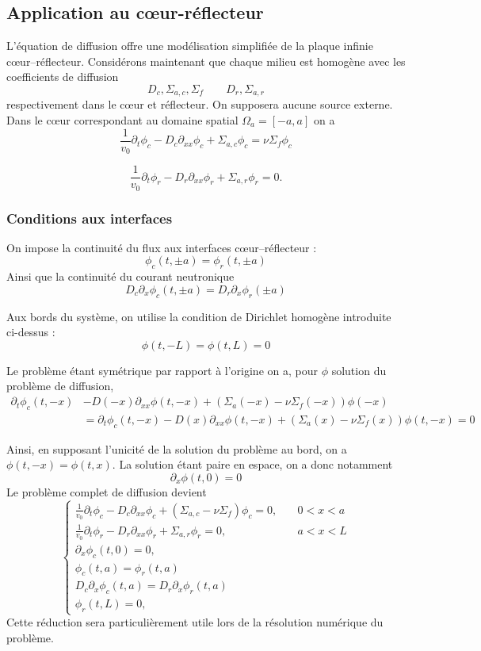 \documentclass{article}
\begin{document}
\subsection{Application au cœur-réflecteur}
L'équation de diffusion offre une modélisation simplifiée de la plaque infinie cœur--réflecteur. Considérons maintenant que chaque milieu est homogène avec les coefficients de diffusion
\[
D_c, \Sigma_{a,c}, \Sigma_f \qquad D_r, \Sigma_{a,r}
\]
respectivement dans le cœur et réflecteur. On supposera aucune source externe. Dans le cœur correspondant au domaine spatial \(\Omega_a = [-a,a]\) on a  
\begin{equation}
    \frac1{v_0}\partial_t\phi_c -D_c\partial_{xx}\phi_c + \Sigma_{a,c}\phi_c = \nu\Sigma_f\phi_c
\end{equation}

\begin{equation}
    \frac1{v_0}\partial_t\phi_r-D_r\partial_{xx}\phi_r+\Sigma_{a,r}\phi_r=0.
\end{equation}

\subsubsection{Conditions aux interfaces}
On impose la continuité du flux aux interfaces cœur--réflecteur :
\[
\phi_c(t,\pm a) = \phi_r(t,\pm a)
\]
Ainsi que la continuité du courant neutronique
\[
D_c\partial_x\phi_c(t,\pm a) = D_r\partial_x\phi_r(\pm a)
\]

Aux bords du système, on utilise la condition de Dirichlet homogène introduite ci-dessus :
\[
\phi(t,-L) = \phi(t,L) = 0
\]

Le problème étant symétrique par rapport à l'origine on a, pour $\phi$ solution du problème de diffusion,
\begin{align*}
    \partial_t\phi_c(t,-x)& -D(-x)\partial_{xx}\phi(t,-x) + (\Sigma_a(-x)-\nu\Sigma_f(-x))\phi(-x)\\
    &= \partial_t\phi_c(t,-x) -D(x)\partial_{xx}\phi(t,-x) + (\Sigma_a(x)-\nu\Sigma_f(x))\phi(t,-x) = 0
\end{align*}

Ainsi, en supposant l'unicité de la solution du problème au bord, on a \(\phi(t,-x)=\phi(t,x)\). La solution étant paire en espace, on a donc notamment
\[
\partial_x\phi(t,0) = 0
\]
Le problème complet de diffusion devient 
\[
\begin{cases}
    \frac{1}{v_0}\partial_t\phi_c - D_c\partial_{xx}\phi_c + (\Sigma_{a,c}-\nu\Sigma_{f})\phi_c = 0, \quad &0 < x <a \\
    \frac{1}{v_0}\partial_t\phi_r - D_r\partial_{xx}\phi_r + \Sigma_{a,r}\phi_r = 0, \quad &a < x <L \\
    \partial_x\phi_c(t,0) =0, \\ 
    \phi_c(t,a) = \phi_r(t,a)\\
    D_c\partial_x\phi_c(t,a) =D_r\partial_x\phi_r(t,a)  \\ 
    \phi_r(t,L) =0, 
\end{cases}
\]
Cette réduction sera particulièrement utile lors de la résolution numérique du problème.
\end{document}
